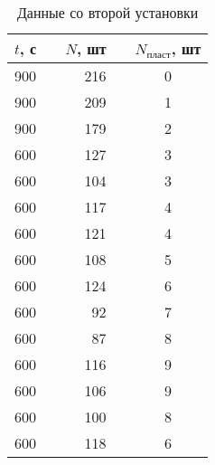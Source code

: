\begin{table}[h!]
\centering
\caption{Данные со второй установки}
\label{tab:data2}
\begin{tabular}{rcrcc}
\toprule
 $t$, с & \hspace*{10pt} &  $N$, шт & \hspace*{10pt} &  $N_{\text{пласт}}$, шт \\
\midrule
  900 && 216 && 0 \\
  900 && 209 && 1 \\
  900 && 179 && 2 \\
  600 && 127 && 3 \\
  600 && 104 && 3 \\
  600 && 117 && 4 \\
  600 && 121 && 4 \\
  600 && 108 && 5 \\
  600 && 124 && 6 \\
  600 && 92  && 7 \\
  600 && 87  && 8 \\
  600 && 116 && 9 \\
  600 && 106 && 9 \\
  600 && 100 && 8 \\
  600 && 118 && 6 \\
\bottomrule
\end{tabular}
\end{table}
